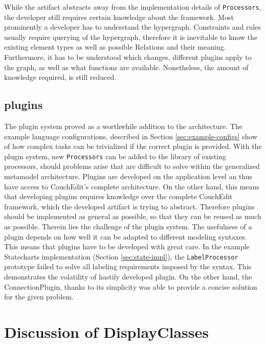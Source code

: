 While the artifact abstracts away from the implementation details of \texttt{Processors}, the developer still requires certain knowledge about the framework. Most prominently a developer has to understand the hypergraph. Constraints and rules usually require querying of the hypergraph, therefore it is inevitable to know the existing element types as well as possible Relations and their meaning. Furthermore, it has to be understood which changes, different plugins apply to the graph, as well as what functions are available. Nonetheless, the amount of knowledge required, is still reduced.   

\subsection{plugins}
The plugin system proved as a worthwhile addition to the architecture. The example language configurations, described in Section \ref{sec:example-configs} show of how complex tasks can be trivialized if the correct plugin is provided. With the plugin system, new \texttt{Processors} can be added to the library of existing processors, should problems arise that are difficult to solve within the generalized metamodel architecture. Plugins are developed on the application level an thus have access to CouchEdit's complete architecture. On the other hand, this means that developing plugins requires knowledge over the complete CouchEdit framework, which the developed artifact is trying to abstract. Therefore plugins should be implemented as general as possible, so that they can be reused as much as possible. Therein lies the challenge of the plugin system. The usefulness of a plugin depends on how well it can be adapted to different modeling syntaxes. This means that plugins have to be developed with great care. In the example Statecharts implementation (Section \ref{sec:state-impl}), the \texttt{LabelProcessor} prototype failed to solve all labeling requirements imposed by the syntax. This demonstrates the volatility of hastily developed plugin. On the other hand, the ConnectionPlugin, thanks to its simplicity was able to provide a concise solution for the given problem.

\section{Discussion of DisplayClasses}

 



\section{}


